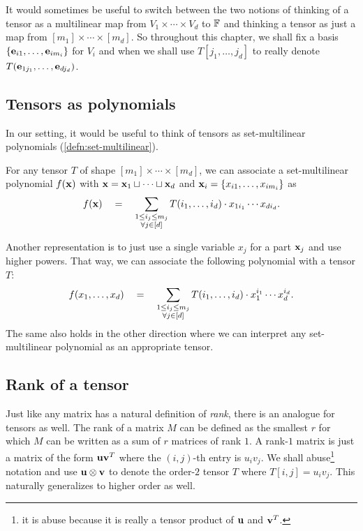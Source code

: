 It would sometimes be useful to switch between the two notions of thinking of a tensor as a multilinear map from $V_1 \times \cdots \times V_d$ to $\mathbb{F}$ and thinking a tensor as just a map from $[m_1] \times \cdots \times [m_d]$.
So throughout this chapter, we shall fix a basis $\left\{\mathbf{e}_{i1},\ldots, \mathbf{e}_{im_i}\right\}$ for $V_i$ and when we shall use $T[j_1,\ldots, j_d]$ to really denote $T(\mathbf{e}_{1j_1},\ldots, \mathbf{e}_{dj_d})$.

\subsection{Tensors as polynomials}

In our setting, it would be useful to think of tensors as set-multilinear polynomials (\autoref{defn:set-multilinear}). 

\begin{observation}\label{obs:tensor-to-sml}
  For any tensor $T$ of shape $[m_1] \times \cdots \times [m_d]$, we can associate a set-multilinear polynomial $f(\mathbf{x})$ with $\mathbf{x} = \mathbf{x}_1 \sqcup \cdots \sqcup \mathbf{x}_d$ and $\mathbf{x}_i = \left\{x_{i1}, \ldots, x_{im_i}\right\}$ as
\begin{equation}\label{eqn:tensor-sml}
f(\mathbf{x}) \quad = \quad \sum_{\substack{1 \leq i_j \leq m_j\\ \forall j \in [d]}}  T(i_1,\ldots, i_d) \cdot x_{1i_1}\cdots x_{di_d}.
\end{equation}
\end{observation}

Another representation is to just use a single variable $x_j$ for a part $\mathbf{x}_j$ and use higher powers.
That way, we can associate the following polynomial with a tensor $T$:
\begin{equation}\label{eqn:tensor-to-prod-univariates}
f(x_1,\ldots, x_d) \quad = \quad \sum_{\substack{1 \leq i_j \leq m_j\\ \forall j \in [d]}}  T(i_1,\ldots, i_d) \cdot x_{1}^{i_1}\cdots x_{d}^{i_d}.
\end{equation}
The same also holds in the other direction where we can interpret any set-multilinear polynomial as an appropriate tensor. 


\subsection{Rank of a tensor}

Just like any matrix has a natural definition of \emph{rank}, there is an analogue for tensors as well.
The rank of a matrix $M$ can be defined as the smallest $r$ for which $M$ can be written as a sum of $r$ matrices of rank $1$.
A rank-$1$ matrix is just a matrix of the form $\mathbf{u} \mathbf{v}^T$ where the $(i,j)$-th entry is $u_iv_j$.
We shall abuse\footnote{it is abuse because it is really a tensor product of $\mathbf{u}$ and $\mathbf{v}^T$.}
notation and use $\mathbf{u} \otimes \mathbf{v}$ to denote the order-$2$ tensor $T$ where $T[i,j] = u_i v_j$.
This naturally generalizes to higher order as well.

